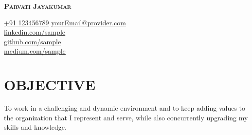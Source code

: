 \documentclass[A4,11pt]{article}
\begin{document}
\begin{comment}
It is always a best practice to add your image in Cvs/Resumes. 
\end{comment}

\begin{minipage}[c]{0.5\textwidth}
    \vspace{2pt}
    \textbf{\Huge \scshape{Parvati Jayakumar}} \\\vspace{1pt}%
    
     \href{+91 123456789}{\underline{+91 123456789}}  %
    \hspace{10pt}
     \href{mailto:yourEmail@provider.com} {\underline{yourEmail@provider.com}} \\ %
     \href{https://www.linkedin.com/in/sample/} {\underline{linkedin.com/sample}} \\ %
     \href{https://github.com/sample} {\underline{github.com/sample}} \\ %
     \href{https://sample.medium.com/} {\underline{medium.com/sample}} \\ %
\end{minipage}
\hspace{150pt} 
\begin{minipage}[c]{0.2\textwidth}
\end{minipage}

\section{OBJECTIVE}
To work in a challenging and dynamic environment and to keep adding values to the organization that I represent and serve, while also concurrently upgrading my skills and knowledge.

\end{document}
